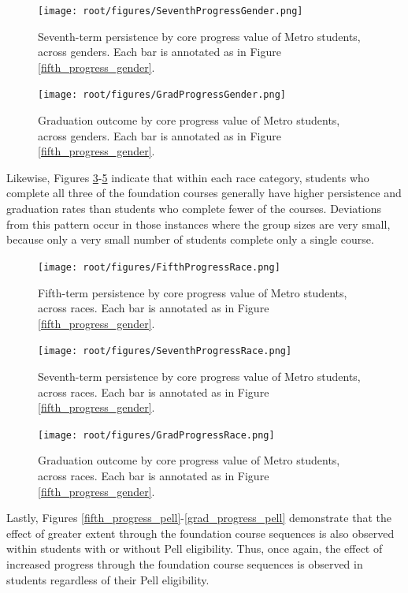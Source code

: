\begin{figure}[htbp]
\centering
\texttt{[image: root/figures/SeventhProgressGender.png]}
\caption{Seventh-term persistence by core progress value of Metro students, across genders.  Each bar is annotated as in Figure \ref{fifth_progress_gender}.}
\label{seventh_progress_gender}
\end{figure}

\begin{figure}[htbp]
\centering
\texttt{[image: root/figures/GradProgressGender.png]}
\caption{Graduation outcome by core progress value of Metro students, across genders.  Each bar is annotated as in Figure \ref{fifth_progress_gender}.}
\label{grad_progress_gender}
\end{figure}

Likewise, Figures \ref{fifth_progress_race}-\ref{grad_progress_race} indicate that within each race category, students who complete all three of the foundation courses generally have higher persistence and graduation rates than students who complete fewer of the courses.  Deviations from this pattern occur in those instances where the group sizes are very small, because only a very small number of students complete only a single course.   

\begin{figure}[htbp]
\centering
\texttt{[image: root/figures/FifthProgressRace.png]}
\caption{Fifth-term persistence by core progress value of Metro students, across races. Each bar is annotated as in Figure \ref{fifth_progress_gender}.}
\label{fifth_progress_race}
\end{figure}

\begin{figure}[htbp]
\centering
\texttt{[image: root/figures/SeventhProgressRace.png]}
\caption{Seventh-term persistence by core progress value of Metro students, across races.  Each bar is annotated as in Figure \ref{fifth_progress_gender}.}
\label{seventh_progress_race}
\end{figure}

\begin{figure}[htbp]
\centering
\texttt{[image: root/figures/GradProgressRace.png]}
\caption{Graduation outcome by core progress value of Metro students, across races.  Each bar is annotated as in Figure \ref{fifth_progress_gender}.}
\label{grad_progress_race}
\end{figure}

Lastly, Figures \ref{fifth_progress_pell}-\ref{grad_progress_pell} demonstrate that the effect of greater extent through the foundation course sequences is also observed within students with or without Pell eligibility.  Thus, once again, the effect of increased progress through the foundation course sequences is observed in students regardless of their Pell eligibility.  

